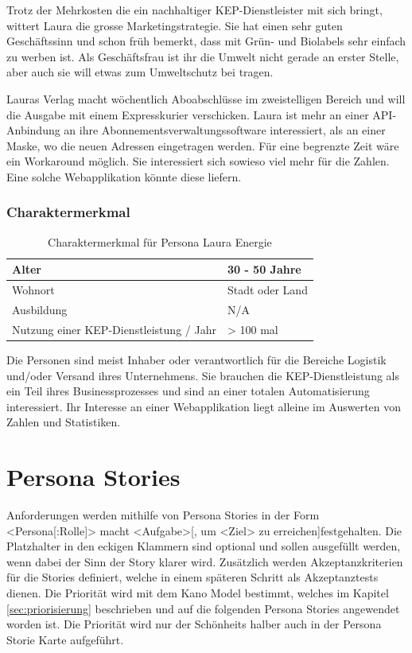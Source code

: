 Trotz der Mehrkosten die ein nachhaltiger KEP-Dienstleister mit sich bringt, wittert Laura die grosse Marketingstrategie. Sie hat einen sehr guten Geschäftssinn und schon früh bemerkt, dass mit Grün- und Biolabels sehr einfach zu werben ist. Als Geschäftsfrau ist ihr die Umwelt nicht gerade an erster Stelle, aber auch sie will etwas zum Umweltschutz bei tragen.


Lauras Verlag macht wöchentlich Aboabschlüsse im zweistelligen Bereich und will die Ausgabe mit einem Expresskurier verschicken. Laura ist mehr an einer API-Anbindung an ihre Abonnementsverwaltungssoftware interessiert, als an einer Maske, wo die neuen Adressen eingetragen werden. Für eine begrenzte Zeit wäre ein Workaround möglich. Sie interessiert sich sowieso viel mehr für die Zahlen. Eine solche Webapplikation könnte diese liefern.

\subsubsection{Charaktermerkmal}
\begin{table}[]
\centering

\label{my-label}
\begin{tabular}{|l|l|}
\hline
Alter                                   & 30 - 50 Jahre        \\ \hline
Wohnort                                 & Stadt oder Land         \\ \hline
Ausbildung                              & N/A  \\ \hline
Nutzung einer KEP-Dienstleistung / Jahr & > 100 mal            \\ \hline
\end{tabular}
\caption{Charaktermerkmal für Persona Laura Energie}
\end{table}

Die Personen sind meist Inhaber oder verantwortlich für die Bereiche Logistik und/oder Versand ihres Unternehmens. Sie brauchen die KEP-Dienstleistung als ein Teil ihres Businessprozesses und sind an einer totalen Automatisierung interessiert. Ihr Interesse an einer Webapplikation liegt alleine im Auswerten von Zahlen und Statistiken.


\newpage{}
\section{Persona Stories}
\label{sec:personastories}

 Anforderungen werden mithilfe von Persona Stories in der Form \glqq <Persona[:Rolle]> macht <Aufgabe>[, um <Ziel> zu erreichen]\grqq festgehalten. Die Platzhalter in den eckigen Klammern sind optional und sollen ausgefüllt werden, wenn dabei der Sinn der Story klarer wird. Zusätzlich werden Akzeptanzkriterien für die Stories definiert, welche in einem späteren Schritt als Akzeptanztests dienen. Die Priorität wird mit dem Kano Model bestimmt, welches im Kapitel \ref{sec:priorisierung} beschrieben und auf die folgenden Persona Stories angewendet worden ist. Die Priorität wird nur der Schönheits halber auch in der Persona Storie Karte aufgeführt.


